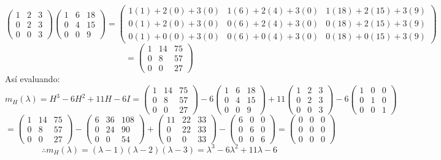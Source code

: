 \begin{enumerate}
\[\begin{pmatrix}
	1 & 2 & 3 \\
	0 & 2 & 3 \\
	0 & 0 & 3\end{pmatrix}\begin{pmatrix}
	1 & 6 & 18 \\
	0 & 4 & 15 \\
	0 & 0 & 9\end{pmatrix}=\begin{pmatrix}
	1(1)+2(0)+3(0) & 1(6)+2(4)+3(0) & 1(18)+2(15)+3(9) \\
	0(1)+2(0)+3(0) & 0(6)+2(4)+3(0) & 0(18)+2(15)+3(9) \\
	0(1)+0(0)+3(0) & 0(6)+0(4)+3(0) & 0(18)+0(15)+3(9) 
	\end{pmatrix}\]\[=\begin{pmatrix}
	1 & 14 & 75 \\
	0 & 8 & 57 \\
	0 & 0 & 27\end{pmatrix}\]
Así evaluando:
\[m_H(\lambda)=H^3-6H^2+11H-6I=\begin{pmatrix}
	1 & 14 & 75 \\
	0 & 8 & 57 \\
	0 & 0 & 27\end{pmatrix}-6\begin{pmatrix}
	1 & 6 & 18 \\
	0 & 4 & 15 \\
	0 & 0 & 9\end{pmatrix}+11\begin{pmatrix}
	1 & 2 & 3 \\
	0 & 2 & 3 \\
	0 & 0 & 3\end{pmatrix}-6\begin{pmatrix}
	1 & 0 & 0 \\
	0 & 1 & 0 \\
	0 & 0 & 1\end{pmatrix}\]
\[=\begin{pmatrix}
	1 & 14 & 75 \\
	0 & 8 & 57 \\
	0 & 0 & 27\end{pmatrix}-\begin{pmatrix}
	6 & 36 & 108 \\
	0 & 24 & 90 \\
	0 & 0 & 54\end{pmatrix}+\begin{pmatrix}
	11 & 22 & 33 \\
	0 & 22 & 33 \\
	0 & 0 & 33\end{pmatrix}-\begin{pmatrix}
	6 & 0 & 0 \\
	0 & 6 & 0 \\
	0 & 0 & 6\end{pmatrix}=\begin{pmatrix}
	0 & 0 & 0 \\
	0 & 0 & 0 \\
	0 & 0 & 0\end{pmatrix}\]\[\therefore m_H(\lambda) =(\lambda -1)(\lambda -2)(\lambda -3)=\lambda ^3-6\lambda ^2+11\lambda -6\]
	

\end{enumerate}
